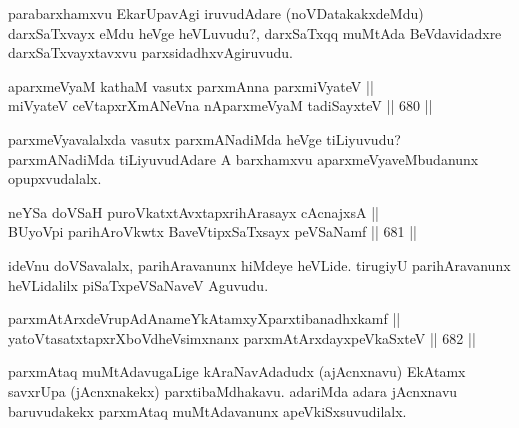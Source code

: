 \begin{artha} 
parabarxhamxvu EkarUpavAgi iruvudAdare (noVDatakakxdeMdu) darxSaTxvayx eMdu heVge heVLuvudu?, darxSaTxqq muMtAda BeVdavidadxre darxSaTxvayxtavxvu parxsidadhxvAgiruvudu.
\end{artha}


\begin{shl}
aparxmeVyaM kathaM vasutx parxmAnna parxmiVyateV || \\
miVyateV ceVtapxrXmANeVna nAparxmeVyaM tadiSayxteV \hfill || 680 ||  
\end{shl}

\begin{artha} 
parxmeVyavalalxda vasutx parxmANadiMda heVge tiLiyuvudu? parxmANadiMda 
tiLiyuvudAdare A barxhamxvu aparxmeVyaveMbudanunx opupxvudalalx.
\end{artha}


\begin{shl}
neYSa doVSaH puroVkatxtAvxtapxrihArasayx cAcnajxsA || \\
BUyoV\s pi parihAroVkwtx BaveVtipxSaTxsayx peVSaNamf \hfill || 681 ||  
\end{shl}

\begin{artha} 
ideVnu doVSavalalx, parihAravanunx hiMdeye heVLide. tirugiyU 
parihAravanunx heVLidalilx piSaTxpeVSaNaveV Aguvudu.
\end{artha}


\begin{shl}
\footnotemark[1]parxmAtArxdeVrupAdAnameYkAtamxyXparxtibanadhxkamf || \\
yatoV\s tasatxtapxrXboVdheV\s simxnanx parxmAtArxdayxpeVkaSxteV \hfill || 682 ||  
\end{shl}

\begin{artha} 
parxmAtaq muMtAdavugaLige kAraNavAdadudx (ajAcnxnavu) EkAtamx savxrUpa (jAcnxnakekx) parxtibaMdhakavu. adariMda adara jAcnxnavu baruvudakekx parxmAtaq muMtAdavanunx apeVkiSxsuvudilalx.
\end{artha}

